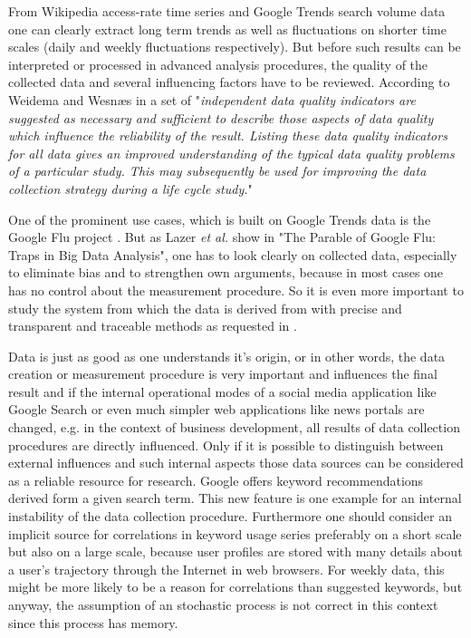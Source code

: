 \documentclass[a4paper,10pt]{scrbook}
\begin{document}

From Wikipedia access-rate time series and Google Trends search volume data one can clearly extract long term trends as well
as fluctuations on shorter time scales (daily and weekly fluctuations respectively). But before such results can be interpreted or processed in advanced analysis procedures, the quality of the collected data and several influencing factors have to be reviewed. 
According to Weidema and Wesn\ae s in \cite{Weidema1996} a set of "\textit{independent data quality indicators are suggested as necessary and sufficient to describe those aspects of data quality which influence the reliability of the result. Listing these data quality indicators for all data gives an improved understanding of the typical data quality problems of a particular study. This may subsequently be used for improving the data collection strategy during a life cycle study.}" 

One of the prominent use cases, which is built on Google Trends data is the Google Flu project \cite{GoogleFLU}. But as Lazer \textit{et al.} show in "The Parable of Google Flu: Traps in Big Data Analysis", one has to look clearly on collected data, especially to eliminate bias and to strengthen own arguments, because in most cases one has no control about the measurement procedure. So it is even more important to study the system from which the data is derived from with precise and transparent and traceable methods as requested in  \cite{Weidema1996}. 

\label{ext.fig.GoogleTrends1}


Data is just as good as one understands it's origin, or in other words, the data creation or measurement procedure is very important and influences the final result and if the internal operational modes of a social media application like Google Search or even much simpler web applications like news portals are changed, e.g. in the context of business development, all results 
of data collection procedures are directly influenced. Only if it is possible to distinguish between external influences and such internal aspects those data sources can be considered as a reliable resource for research. Google offers keyword recommendations derived form a given search term. This new feature is one example for an internal instability of the data collection procedure. Furthermore one should consider an implicit source for correlations in keyword usage series preferably on a short scale but also on a large scale, because user profiles are stored with many details about a user's trajectory through the Internet in web browsers. For weekly data, this might be more likely to be a reason for correlations than suggested keywords, but anyway, the assumption of an stochastic process is not correct in this context since this process has memory.
  
\end{document}
